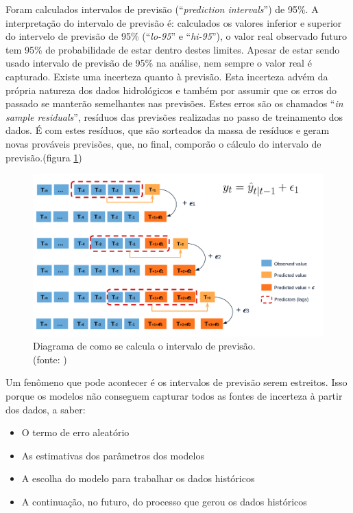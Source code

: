 Foram calculados intervalos de previsão (``\textit{prediction intervals}'') de 95\%. A interpretação do intervalo de previsão é: calculados os valores inferior e superior do intervelo de previsão de 95\% (``\textit{lo-95}'' e ``\textit{hi-95}''), o valor real observado futuro tem 95\% de probabilidade de estar dentro destes limites.\cite{hyndman_fpp3_2024a} Apesar de estar sendo usado intervalo de previsão de 95\% na análise, nem sempre o valor real é capturado. Existe uma incerteza quanto à previsão. Esta incerteza advém da própria natureza dos dados hidrológicos e também por assumir que os erros do passado se manterão semelhantes nas previsões. Estes erros são os chamados ``\textit{in sample residuals}'', resíduos das previsões realizadas no passo de treinamento dos dados. É com estes resíduos, que são sorteados da massa de resíduos e geram novas prováveis previsões, que, no final, comporão o cálculo do intervalo de previsão.(figura \ref{fig:diagram-bootstrapping-prediction-intervals})

\begin{figure}[!h]
	\centering
	\includegraphics[scale=0.17]{Figuras/diagram-bootstrapping-prediction-intervals.png}
	\caption{Diagrama de como se calcula o intervalo de previsão.\\(fonte: \cite{skforecast_b})}
	\label{fig:diagram-bootstrapping-prediction-intervals}
\end{figure}


Um fenômeno que pode acontecer é os intervalos de previsão serem estreitos.\cite{RobHyndman_prediction_intervals} Isso porque os modelos não conseguem capturar todos as fontes de incerteza à partir dos dados, a saber:

\begin{itemize}
	\item O termo de erro aleatório
	\item As estimativas dos parâmetros dos modelos
	\item A escolha do modelo para trabalhar os dados históricos
	\item A continuação, no futuro, do processo que gerou os dados históricos
\end{itemize}

